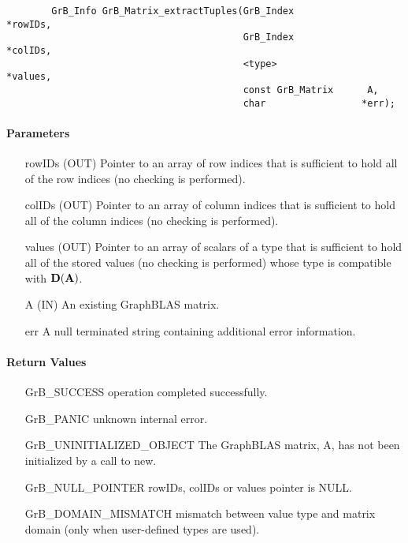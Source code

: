 \begin{verbatim}
        GrB_Info GrB_Matrix_extractTuples(GrB_Index            *rowIDs,
                                          GrB_Index            *colIDs,
                                          <type>               *values, 
                                          const GrB_Matrix      A,
                                          char                 *err);
\end{verbatim}

\paragraph{Parameters}

\begin{itemize}[leftmargin=1.1in]
    \item[{\sf rowIDs}] ({\sf OUT}) Pointer to an array of row indices that is sufficient to
                        hold all of the row indices (no checking is performed).
    \item[{\sf colIDs}] ({\sf OUT}) Pointer to an array of column indices that is sufficient to
                        hold all of the column indices (no checking is performed). 
    \item[{\sf values}] ({\sf OUT}) Pointer to an array of scalars of a type that is sufficient to
                        hold all of the stored values (no checking is performed) whose
                        type is compatible with $\bold{D}({\bf A})$.
    \item[{\sf A}]      ({\sf IN}) An existing GraphBLAS matrix.
    \item[{\sf err}]     A null terminated string containing additional error information.
\end{itemize}

\paragraph{Return Values}

\begin{itemize}[leftmargin=2.1in]
\item[{\sf GrB\_SUCCESS}]     operation completed successfully.
\item[{\sf GrB\_PANIC}]       unknown internal error.
\item[{\sf GrB\_UNINITIALIZED\_OBJECT}]    The GraphBLAS matrix, {\sf A}, has not been 
                       initialized by a call to {\sf new}.
\item[{\sf GrB\_NULL\_POINTER}]  {\sf rowIDs}, {\sf colIDs} or {\sf values} pointer is {\sf NULL}.
\item[\sf GrB\_DOMAIN\_MISMATCH]  
                       mismatch between value type and matrix domain (only when 
                       user-defined types are used).
\end{itemize}

